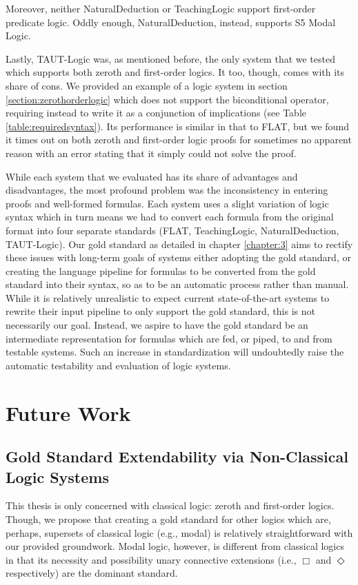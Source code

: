 \documentclass[ms]{uncgdissertationexp2}
\theoremstyle{plain}
\theoremstyle{definition}
\theoremstyle{remark}
\begin{document}
Moreover, neither NaturalDeduction or TeachingLogic support first-order predicate logic. Oddly enough, NaturalDeduction, instead, supports S5 Modal Logic. 

Lastly, TAUT-Logic was, as mentioned before, the only system that we tested which supports both zeroth and first-order logics. It too, though, comes with its share of cons. We provided an example of a logic system in section \ref{section:zerothorderlogic} which does not support the biconditional operator, requiring instead to write it as a conjunction of implications (see Table \ref{table:requiredsyntax}). Its performance is similar in that to FLAT, but we found it times out on both zeroth and first-order logic proofs for sometimes no apparent reason with an error stating that it simply could not solve the proof. 

While each system that we evaluated has its share of advantages and disadvantages, the most profound problem was the inconsistency in entering proofs and well-formed formulas. Each system uses a slight variation of logic syntax which in turn means we had to convert each formula from the original format into four separate standards (FLAT, TeachingLogic, NaturalDeduction, TAUT-Logic). Our gold standard as detailed in chapter \ref{chapter:3} aims to rectify these issues with long-term goals of systems either adopting the gold standard, or creating the language pipeline for formulas to be converted from the gold standard into their syntax, so as to be an automatic process rather than manual. While it is relatively unrealistic to expect current state-of-the-art systems to rewrite their input pipeline to only support the gold standard, this is not necessarily our goal. Instead, we aspire to have the gold standard be an intermediate representation for formulas which are fed, or piped, to and from testable systems. Such an increase in standardization will undoubtedly raise the automatic testability and evaluation of logic systems.

\section{Future Work}
\subsection{Gold Standard Extendability via Non-Classical Logic Systems}
This thesis is only concerned with classical logic: zeroth and first-order logics. Though, we propose that creating a gold standard for other logics which are, perhaps, supersets of classical logic (e.g., modal) is relatively straightforward with our provided groundwork. Modal logic, however, is different from classical logics in that its necessity and possibility unary connective extensions (i.e., $\Box$ and $\Diamond$ respectively) are the dominant standard.
\end{document}
